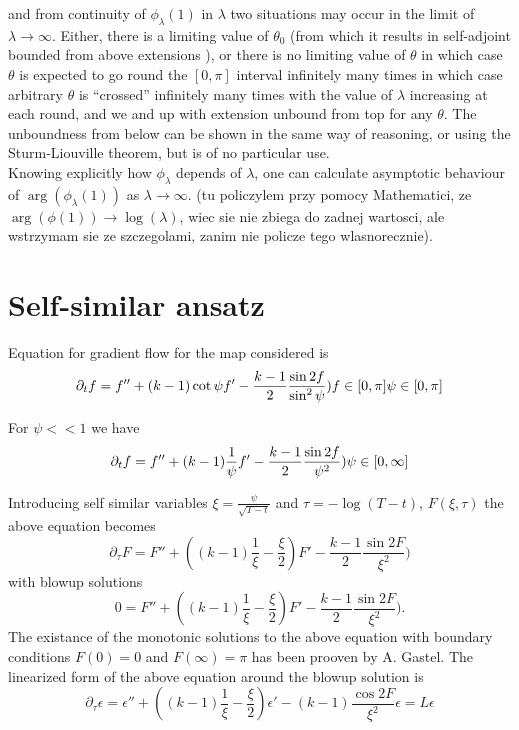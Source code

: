 and from continuity of $\phi_\lambda(1)$ in $\lambda$ two situations
may occur in the limit of $\lambda\rightarrow\infty$. Either, there is
a limiting value of $\theta_0$ (from which it results in self-adjoint
bounded from above extensions ), or there is no limiting value of
$\theta$ in which case $\theta$ is expected to go round the $[0,\pi]$
interval infinitely many times in which case arbitrary $\theta$ is
``crossed'' infinitely many times with the value of $\lambda$
increasing at each round, and we and up with extension unbound from
top for any $\theta$. The unboundness from below can be shown in the
same way of reasoning, or using the Sturm-Liouville theorem, but is of
no particular use.
\\
Knowing explicitly how $\phi_\lambda$ depends of $\lambda$, one can
calculate asymptotic behaviour of $\arg(\phi_\lambda(1))$ as
$\lambda\rightarrow\infty$. (tu policzylem przy pomocy Mathematici, ze
$\arg(\phi(1))\rightarrow\log(\lambda)$, wiec sie nie zbiega do zadnej
wartosci, ale wstrzymam sie ze szczegolami, zanim nie policze tego
wlasnorecznie).

\section{Self-similar ansatz}


Equation for gradient flow for the map considered is
\begin{equation}
  \label{eq:grad_flow}
  \partial_t f=f''+(k-1)\cot \psi f'-\frac{k-1}{2}\frac{\sin2f}{\sin^2 \psi})\\
  f\in [0,\pi]\\
  \psi\in [0,\pi]
\end{equation}


For $\psi<<1$ we have
\begin{equation}
  \partial_t f=f''+(k-1)\frac{1}{\psi} f'-\frac{k-1}{2}\frac{\sin2f}{\psi^2})\\
  \psi\in [0,\infty]
\end{equation}

Introducing self similar variables $\xi=\frac{\psi}{\sqrt{T-t}}$ and
$\tau=-\log(T-t)$, $F(\xi,\tau)$ the above equation becomes
\begin{equation}
  \partial_\tau F=F''+((k-1)\frac{1}{\xi}-\frac{\xi}{2}) F'-\frac{k-1}{2}\frac{\sin2F}{\xi^2})
\end{equation}
with blowup solutions
\begin{equation}
  0=F''+((k-1)\frac{1}{\xi}-\frac{\xi}{2}) F'-\frac{k-1}{2}\frac{\sin2F}{\xi^2}).
\end{equation}
The existance of the monotonic solutions to the above equation with
boundary conditions $F(0)=0$ and $F(\infty)=\pi$ has been prooven by
A. Gastel. The linearized form of the above equation around the blowup
solution is
\begin{equation}
  \partial_\tau \epsilon=\epsilon''+((k-1)\frac{1}{\xi}-\frac{\xi}{2}) \epsilon'-(k-1)\frac{\cos2F}{\xi^2}\epsilon=L\epsilon
\end{equation}

